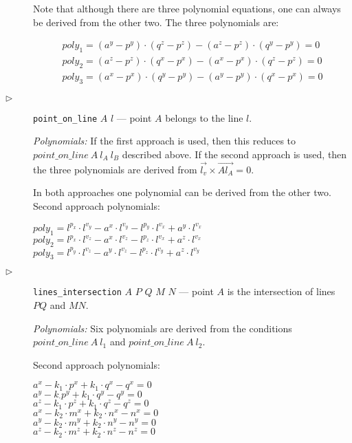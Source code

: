 \documentclass{article}
\begin{document}
\begin{description}
Note that although there are three polynomial equations, one can
always be derived from the other two. The three polynomials are:

\begin{eqnarray*}
  poly_1 = (a^y - p^y)\cdot (q^z - p^z) - (a^z - p^z)\cdot (q^y - p^y) = 0\\
  poly_2 = (a^z - p^z)\cdot (q^x - p^x) - (a^x - p^x)\cdot (q^z - p^z) = 0\\
  poly_3 = (a^x - p^x)\cdot (q^y - p^y) - (a^y - p^y)\cdot (q^x - p^x) = 0
\end{eqnarray*}


\item[$\triangleright$] {\tt point\_on\_line} $A$ $l$ --- point $A$ belongs
  to the line $l$.

{\em Polynomials:} If the first approach is used, then this reduces to
$point\_on\_line\ A\ l_A\ l_B$ described above. If the second approach is
used, then the three polynomials are derived from
$\overrightarrow{l_v} \times \overrightarrow{Al_A} = 0$.

In both approaches one polynomial can be derived from the other
two. Second approach polynomials:
\begin{tabbing}
$poly_1 = l^{p_x}\cdot l^{v_y} - a^x\cdot l^{v_y} - l^{p_y}\cdot l^{v_x} + a^y\cdot l^{v_x}$ \\
$poly_2 = l^{p_x}\cdot l^{v_z} - a^x\cdot l^{v_z} - l^{p_z}\cdot l^{v_x} + a^z\cdot l^{v_x}$ \\
$poly_3 = l^{p_y}\cdot l^{v_z} - a^y\cdot l^{v_z} - l^{p_z}\cdot l^{v_y} + a^z\cdot l^{v_y}$
\end{tabbing}

\item[$\triangleright$] {\tt lines\_intersection} $A$ $P$ $Q$ $M$ $N$
  --- point $A$ is the intersection of lines $PQ$ and $MN$.

{\em Polynomials:} Six polynomials are derived from the conditions
$point\_on\_line\ A\ l_1$ and $point\_on\_line\ A\ l_2$.

Second approach polynomials:


\begin{tabbing}
$a^x - k_1\cdot p^x + k_1\cdot q^x - q^x = 0$ \\
$a^y - k_\cdot p^y + k_1\cdot q^y - q^y = 0$ \\
$a^z - k_1\cdot p^z + k_1\cdot q^z - q^z = 0$ \\
$a^x - k_2\cdot m^x + k_2\cdot n^x - n^x = 0$ \\
$a^y - k_2\cdot m^y + k_2\cdot n^y - n^y = 0$ \\
$a^z - k_2\cdot m^z + k_2\cdot n^z - n^z = 0$
\end{tabbing}


\end{description}
\end{document}
